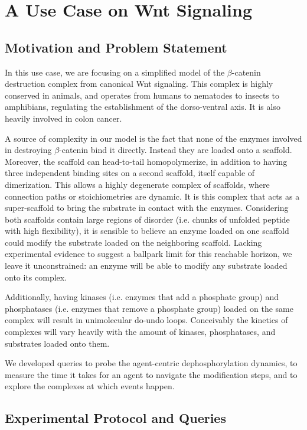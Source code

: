 \section{A Use Case on Wnt Signaling}


\subsection{Motivation and Problem Statement}

In this use case, we are focusing on a simplified model of the
$\beta$-catenin destruction complex from canonical Wnt signaling. This
complex is highly conserved in animals, and operates from humans to
nematodes to insects to amphibians, regulating the establishment of
the dorso-ventral axis. It is also heavily involved in colon cancer.

A source of complexity in our model is the fact that none of the
enzymes involved in destroying $\beta$-catenin bind it directly.
Instead they are loaded onto a scaffold. Moreover, the scaffold can 
head-to-tail homopolymerize, in addition to having three independent
binding sites on a second scaffold, itself capable of dimerization.
This allows a highly degenerate complex of scaffolds, where connection
paths or stoichiometries are dynamic. It is this complex that acts as a
super-scaffold to bring the substrate in contact with the
enzymes. Considering both scaffolds contain large regions of disorder
(i.e. chunks of unfolded peptide with high flexibility), it is
sensible to believe an enzyme loaded on one scaffold could modify the
substrate loaded on the neighboring scaffold. Lacking experimental
evidence to suggest a ballpark limit for this reachable horizon, we
leave it unconstrained: an enzyme will be able to modify any substrate
loaded onto its complex.

Additionally, having kinases (i.e. enzymes that add a phosphate group)
and phosphatases (i.e. enzymes that remove a phosphate group) loaded on
the same complex will result in unimolecular do-undo loops. Conceivably
the kinetics of complexes will vary heavily with the amount of kinases,
phosphatases, and substrates loaded onto them.

We developed queries to probe the agent-centric dephosphorylation
dynamics, to measure the time it takes for an agent to navigate the 
modification steps, and to explore the complexes at which events happen.


\subsection{Experimental Protocol and Queries}

